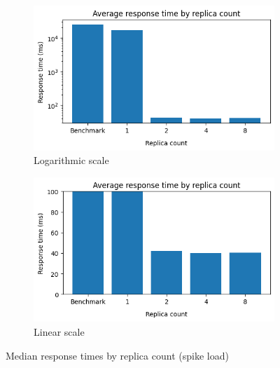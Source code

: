 \begin{figure}[h]
    \centering
    \begin{subfigure}{.5\textwidth}
      \centering
      \includegraphics[width=\linewidth]{figures/uor-replica-count-rt-comp-spike1.png}
      \caption{Logarithmic scale}
    \end{subfigure}%
    \begin{subfigure}{.5\textwidth}
      \centering
      \includegraphics[width=\linewidth]{figures/uor-replica-count-rt-comp-spike2.png}
      \caption{Linear scale}
    \end{subfigure}

    \caption{Median response times by replica count (spike load)}
    \label{figure:uor-replica-count-rt-comp-spike}
\end{figure}

